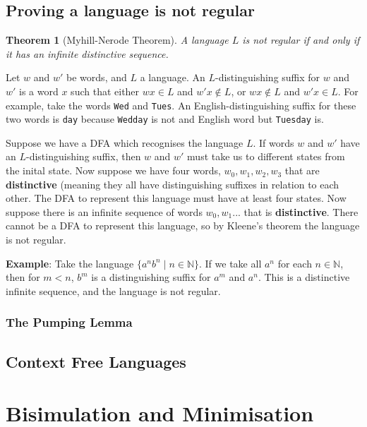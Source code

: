 \documentclass[11pt]{article}
\newtheorem{theorem}{Theorem}
\begin{document}
	\subsection{Proving a language is not regular}
	\begin{theorem}[Myhill-Nerode Theorem]
	A language $L$ is not regular if and only if it has an infinite distinctive sequence.
	\end{theorem}
	
	Let $w$ and $w'$ be words, and $L$ a language. An $L$-distinguishing suffix for $w$ and $w'$ is a word $x$ such that either $wx \in L$ and $w'x \notin L$, or $wx \notin L$ and $w'x \in L$. For example, take the words \texttt{Wed} and \texttt{Tues}. An English-distinguishing suffix for these two words is \texttt{day} because \texttt{Wedday} is not and English word but \texttt{Tuesday} is.
	
	\par Suppose we have a DFA which recognises the language $L$. If words $w$ and $w'$ have an $L$-distinguishing suffix, then $w$ and $w'$ must take us to different states from the inital state. Now suppose we have four words, $w_{0}, w_{1}, w_{2}, w_{3}$ that are \textbf{distinctive} (meaning they all have distinguishing suffixes in relation to each other. The DFA to represent this language must have at least four states. Now suppose there is an infinite sequence of words $w_{0}, w_{1}...$ that is \textbf{distinctive}. There cannot be a DFA to represent this language, so by Kleene's theorem the language is not regular.
	
	\par 
	\textbf{Example}: Take the language $\{a^{n}b^{n} \;|\; n \in \mathbb{N}\}$. If we take all $a^{n}$ for each $n \in \mathbb{N}$, then for $m < n$, $b^{m}$ is a distinguishing suffix for $a^{m}$ and $a^{n}$. This is a distinctive infinite sequence, and the language is not regular.
	
	\subsubsection{The Pumping Lemma}
	
	\subsection{Context Free Languages}
	
	\section{Bisimulation and Minimisation}
\end{document}
